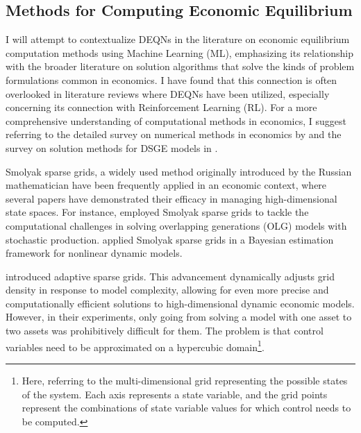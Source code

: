 \subsection{Methods for Computing Economic Equilibrium}
 

I will attempt to contextualize DEQNs \parencite{Azinovic2022DEQN} in the literature on economic equilibrium computation methods using Machine Learning (ML), emphasizing its relationship with the broader literature on solution algorithms that solve the kinds of problem formulations common in economics. I have found that this connection is often overlooked in literature reviews where DEQNs have been utilized, especially concerning its connection with Reinforcement Learning (RL). For a more comprehensive understanding of computational methods in economics, I suggest referring to the detailed survey on numerical methods in economics by \textcite{Maliar2014numerical_methods} and the survey on solution methods for DSGE models in \textcite{Villaverde2016survey_solution_dsge}.

Smolyak sparse grids, a widely used method originally introduced by the Russian mathematician \textcite{smolyak1963quadrature} have been frequently applied in an economic context, where several papers have demonstrated their efficacy in managing high-dimensional state spaces. For instance, \textcite{KruegerKubler2004} employed Smolyak sparse grids to tackle the computational challenges in solving overlapping generations (OLG) models with stochastic production. \textcite{WinschelKratzig2010} applied Smolyak sparse grids in a Bayesian estimation framework for nonlinear dynamic models. 

\textcite{BrummScheidegger2017sparse} introduced adaptive sparse grids. This advancement dynamically adjusts grid density in response to model complexity, allowing for even more precise and computationally efficient solutions to high-dimensional dynamic economic models. However, in their experiments, only going from solving a model with one asset to two assets was prohibitively difficult for them. The problem is that control variables need to be approximated on a hypercubic domain\footnote{Here, referring to the multi-dimensional grid representing the possible states of the system. Each axis represents a state variable, and the grid points represent the combinations of state variable values for which control needs to be computed.}. 

